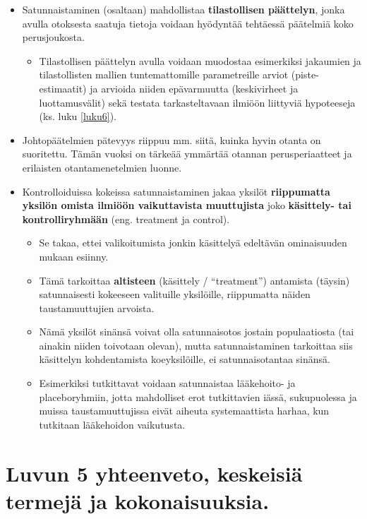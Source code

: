 \documentclass[
]{book}
\providecommand{\tightlist}{%
  \setlength{\itemsep}{0pt}\setlength{\parskip}{0pt}}
\begin{document}
\begin{itemize}
\item
  Satunnaistaminen (osaltaan) mahdollistaa \textbf{tilastollisen päättelyn}, jonka avulla otoksesta saatuja tietoja voidaan hyödyntää tehtäessä päätelmiä koko perusjoukosta.

  \begin{itemize}
  \tightlist
  \item
    Tilastollisen päättelyn avulla voidaan muodostaa esimerkiksi jakaumien ja tilastollisten mallien tuntemattomille parametreille arviot (piste-estimaatit) ja arvioida niiden epävarmuutta (keskivirheet ja luottamusvälit) sekä testata tarkasteltavaan ilmiöön liittyviä hypoteeseja (ks. luku \ref{luku6}).
  \end{itemize}
\item
  Johtopäätelmien pätevyys riippuu mm. siitä, kuinka hyvin otanta on suoritettu. Tämän vuoksi on tärkeää ymmärtää otannan perusperiaatteet ja erilaisten otantamenetelmien luonne.
\item
  Kontrolloiduissa kokeissa satunnaistaminen jakaa yksilöt \textbf{riippumatta yksilön omista ilmiöön vaikuttavista muuttujista} joko \textbf{käsittely- tai kontrolliryhmään} (eng. treatment ja control).

  \begin{itemize}
  \tightlist
  \item
    Se takaa, ettei valikoitumista jonkin käsittelyä edeltävän ominaisuuden mukaan esiinny.
  \item
    Tämä tarkoittaa \textbf{altisteen} (käsittely / ``treatment'') antamista (täysin) satunnaisesti kokeeseen valituille yksilöille, riippumatta näiden taustamuuttujien arvoista.
  \item
    Nämä yksilöt sinänsä voivat olla satunnaisotos jostain populaatiosta (tai ainakin niiden toivotaan olevan), mutta satunnaistaminen tarkoittaa siis käsittelyn kohdentamista koeyksilöille, ei satunnaisotantaa sinänsä.
  \item
    Esimerkiksi tutkittavat voidaan satunnaistaa lääkehoito- ja placeboryhmiin, jotta mahdolliset erot tutkittavien iässä, sukupuolessa ja muissa taustamuuttujissa eivät aiheuta systemaattista harhaa, kun tutkitaan lääkehoidon vaikutusta.
  \end{itemize}
\end{itemize}

\hypertarget{luvun-5-yhteenveto-keskeisiuxe4-termejuxe4-ja-kokonaisuuksia.}{%
\section{Luvun 5 yhteenveto, keskeisiä termejä ja kokonaisuuksia.}\label{luvun-5-yhteenveto-keskeisiuxe4-termejuxe4-ja-kokonaisuuksia.}}
\end{document}
